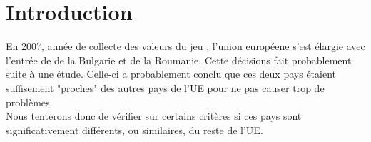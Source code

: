 \section{Introduction}
En 2007, année de collecte des valeurs du jeu \jeuc, l'union européene s'est élargie avec l'entrée de de la Bulgarie et de la Roumanie. Cette décisions fait probablement suite à une étude. Celle-ci a probablement conclu que ces deux pays étaient suffisement "proches" des autres pays de l'UE pour ne pas causer trop de problèmes.\\
Nous tenterons donc de vérifier sur certains critères si ces pays sont significativement différents, ou similaires, du reste de l'UE.

 
